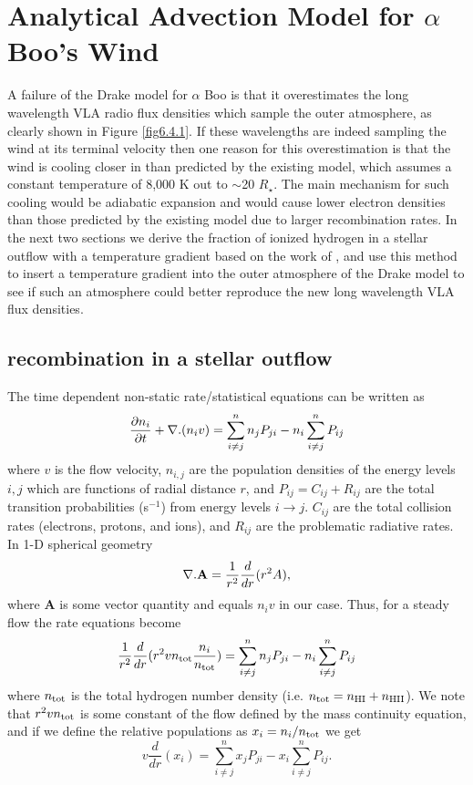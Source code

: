 \section{Analytical Advection Model for $\alpha$ Boo's Wind}
\label{sec:6.7}
A failure of the Drake model for $\alpha$ Boo is that it overestimates the long wavelength VLA radio flux densities which sample the outer atmosphere, as clearly shown in Figure \ref{fig6.4.1}. If these wavelengths are indeed sampling the wind at its terminal velocity then one reason for this overestimation is that the wind is cooling closer in than predicted by the existing model, which assumes a constant temperature of 8,000 K out to $\sim$20 $R_{\star}$. The main mechanism for such cooling would be adiabatic expansion \citep{ogorman_2011} and would cause lower electron densities than those predicted by the existing model due to larger recombination rates. In the next two sections we derive the fraction of ionized hydrogen in a stellar outflow with a temperature gradient based on the work of \cite{glassgold_1986}, and use this method to insert a temperature gradient into the outer atmosphere of the Drake model to see if such an atmosphere could better reproduce the new long wavelength VLA flux densities.

\subsection{ recombination in a stellar outflow}\label{sec:6.6.1}

The time dependent non-static rate/statistical equations can be written as
\begin{equation}
\frac{\partial n_{i}}{\partial t}+{\bf \nabla }{.(n_{i}v)} = \sum_{i\neq j}^n n_{j}P_{ji} - n_{i}\sum_{i\neq j}^n P_{ij} 
\end{equation}
where $v$ is the flow velocity, $n_{i,j}$ are the population densities of the energy levels $i,j$ which are functions of radial distance $r$, and  $P_{ij}=C_{ij}+R_{ij}$ are the total transition probabilities (s$^{-1}$) from energy levels $i \rightarrow j$. $C_{ij}$ are the total collision rates (electrons, protons, and ions), and $R_{ij}$ are the problematic radiative rates. In 1-D spherical geometry
\begin{equation}
{\bf \nabla }{.\textbf{A}} = \frac{1}{r^2}\frac{d}{dr}(r^2 A),
\end{equation}
where $\textbf{A}$ is some vector quantity and equals $n_{i}v$ in our case. Thus, for a steady flow the rate equations become
\begin{equation}
\frac{1}{r^2}\frac{d}{dr}(r^2 vn_{\rm{tot}}\frac{n_{i}}{n_{\rm{tot}}}) = \sum_{i\neq j}^{n} n_{j}P_{ji} - n_{i}\sum_{i\neq j}^n P_{ij}
\end{equation}
where $n_{\rm{tot}}$ is the total hydrogen number density (i.e. $n_{\rm{tot}} = n_{\rm{HI}}+n_{\rm{HII}}$).
We note that $r^2 vn_{\rm{tot}}$ is some constant of the flow defined by the mass continuity equation, and if we define the relative populations as $x_{i}=n_{i}/n_{\rm{tot}}$ we get
\begin{equation}
v\frac{d}{dr}(x_{i}) = \sum_{i\neq j}^{n} x_{j}P_{ji} - x_{i}\sum_{i\neq j}^n P_{ij}.
\label{eq:eq6.9.1}
\end{equation}


